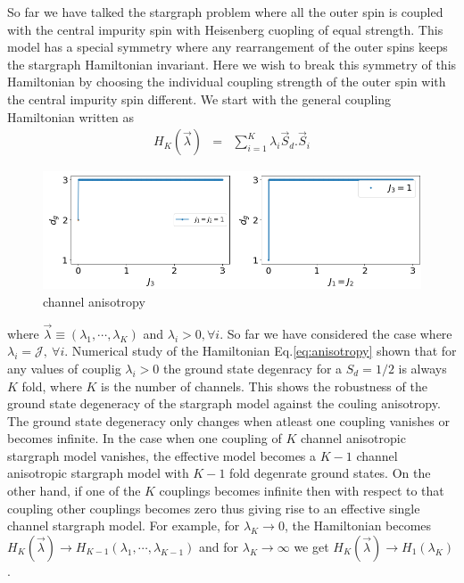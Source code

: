 \documentclass[reprint,prb,superscriptaddress]{revtex4-2}
\begin{document}
\noindent So far we have talked the stargraph problem where all the outer spin is coupled with the central impurity spin with Heisenberg cuopling of equal strength. This model has a special symmetry where any rearrangement of the outer spins keeps the stargraph Hamiltonian invariant. Here we wish to break this symmetry of this Hamiltonian by choosing the individual coupling strength of the outer spin with the central impurity spin different. We start with the general coupling Hamiltonian written as 
\begin{eqnarray}
H_K (\vec{\lambda}) &=& \sum_{i=1}^{K} \lambda_i\vec{S}_d.\vec{S}_i
\label{eq:anisotropy}
\end{eqnarray}

\begin{figure}\centering
\includegraphics[scale=0.28]{plt/Anisotropy_Channel_3.png}
\caption{channel anisotropy}
\label{fig:channel-anisotropy}
\end{figure}

where $ \vec{\lambda} \equiv (\lambda_1,\cdots,\lambda_K)$ and $\lambda_i>0, \forall i$. So far we have considered the case where $\lambda_i={\mathcal{J}},~\forall i$. Numerical study of the Hamiltonian Eq.\eqref{eq:anisotropy} shown that for any values of couplig $\lambda_i>0$ the ground state degenracy for a $S_d=1/2$ is always $K$ fold, where $K$ is the number of channels. This shows the robustness of the ground state degeneracy of the stargraph model against the couling anisotropy. The ground state degeneracy only changes when atleast one coupling vanishes or becomes infinite. In the case when one coupling of $K$ channel anisotropic stargraph model vanishes, the effective model becomes a $K-1$ channel anisotropic stargraph model with $K-1$ fold degenrate ground states. On the other hand, if one of the $K$ couplings becomes infinite then with respect to that coupling other couplings becomes zero thus giving rise to an effective single channel stargraph model. For example, for $\lambda_K\rightarrow 0$, the Hamiltonian becomes $H_{K}(\vec{\lambda})\rightarrow H_{K-1}(\lambda_1,\cdots,\lambda_{K-1})$ and for $\lambda_K\rightarrow \infty$ we get $H_{K}(\vec{\lambda}) \rightarrow H_{1}(\lambda_K)$. 
\end{document}

